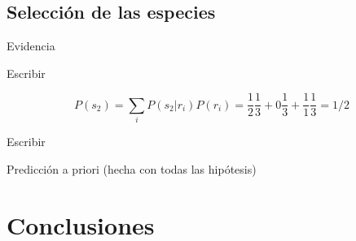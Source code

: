 \documentclass[a4paper,10pt]{book}
\begin{document}
\subsection{Selección de las especies}

Evidencia

 Escribir
 
 \begin{equation*}
  P(s_2) = \sum_i P(s_2|r_i) P(r_i) = \frac{1}{2} \frac{1}{3} + 0 \frac{1}{3} + \frac{1}{1} \frac{1}{3} = 1/2 
 \end{equation*}
 
 Escribir
 
 \begin{framed} \centering
 Predicción a priori (hecha con todas las hipótesis)
 \end{framed}






\section{Conclusiones}
\end{document}
